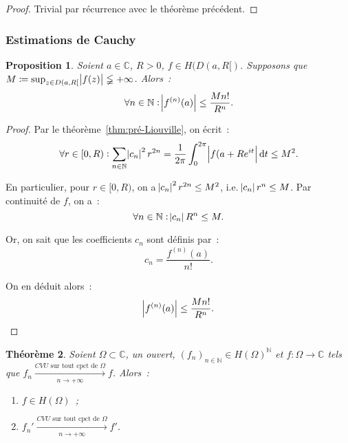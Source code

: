 \documentclass{report}
\newtheorem{thm}{Théorème}[chapter]
\newtheorem{prp}[thm]{Proposition}
\theoremstyle{definition}
\theoremstyle{remark}
\numberwithin{equation}{section}
\newcommand{\C}{\mathbb C}
\newcommand{\N}{\mathbb N}
\newcommand{\CONV}[5]{\xrightarrow[#2 \to #3]{#4 \text{ #5 } #1}}
\newcommand{\CVUc}[3]{\CONV{#1}{#2}{#3}{CVU}{sur tout cpct de}}
\newcommand{\pinfty}{{+\infty}}
\begin{document}
			\begin{proof} Trivial par récurrence avec le théorème précédent.
			\end{proof}

		\subsubsection{Estimations de Cauchy}
			\begin{prp} Soient $a \in \C$, $R > 0$, $f \in H(D(a, R[)$. Supposons que $M \coloneqq \sup_{z \in D(a, R[}\abs {f(z)} \lneqq \pinfty$. Alors~:
			\begin{equation}
				\forall n \in \N : \abs {f^{(n)}(a)} \leq \frac {Mn!}{R^n}.
			\end{equation}
			\end{prp}

			\begin{proof} Par le théorème~\ref{thm:pré-Liouville}, on écrit~:
			\begin{equation}
				\forall r \in [0, R) : \sum_{n \in \N}\abs {c_n}^2r^{2n} = \frac 1{2\pi}\int_0^{2\pi}\abs {f(a+Re^{it}}\dif t \leq M^2.
			\end{equation}

			En particulier, pour $r \in [0, R)$, on a $\abs {c_n}^2r^{2n} \leq M^2$, i.e. $\abs {c_n}r^n \leq M$. Par continuité de $f$, on a~:
			\begin{equation}
				\forall n \in \N : \abs {c_n}R^n \leq M.
			\end{equation}

			Or, on sait que les coefficients $c_n$ sont définis par~:
			\begin{equation}
				c_n = \frac {f^{(n)}(a)}{n!}.
			\end{equation}

			On en déduit alors~:
			\begin{equation}
				\abs {f^{(n)}(a)} \leq \frac {Mn!}{R^n}.
			\end{equation}
			\end{proof}

			\begin{thm} Soient $\Omega \subset \C$, un ouvert, $(f_n)_{n \in \N} \in H(\Omega)^\N$ et $f : \Omega \to \C$ tels que
			$f_n \CVUc \Omega n\pinfty f$. Alors~:
			\begin{enumerate}
				\item $f \in H(\Omega)$~;
				\item $f_n' \CVUc \Omega n\pinfty f'$.
			\end{enumerate}
			\end{thm}
\end{document}
